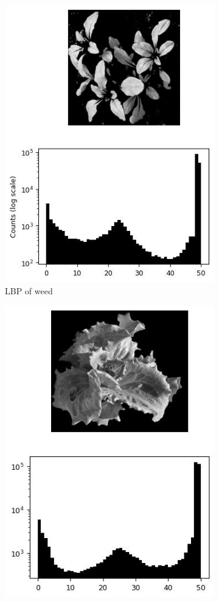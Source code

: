 \documentclass[letterpaper]{article}
\begin{document}
{\begin{figure}[H]
	\centering
	\begin{subfigure}{0.48\linewidth}
		\centering
		\includegraphics[scale=.4]{./figures/lbp-left.jpg}
		\caption{LBP of weed}
		\label{subfig:lbp-weed}	
	\end{subfigure}
	\begin{subfigure}{0.48\linewidth}
		\centering
		\includegraphics[scale=.4]{./figures/lbp-right.jpg}

\end{subfigure}
\end{figure}}
\end{document}
